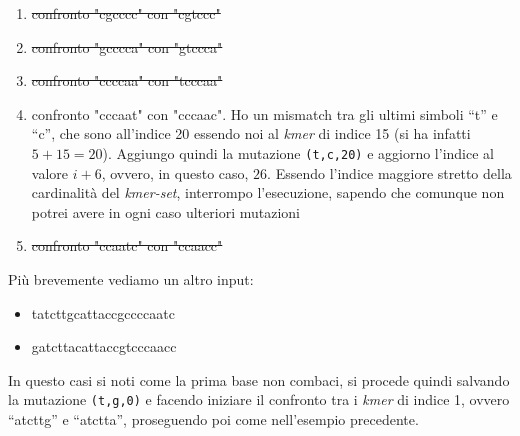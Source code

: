 \documentclass[a4paper,12pt, oneside]{book}
\begin{document}
\begin{esempio}
\begin{enumerate}[start=0]
    \item \sout{confronto "cgcccc" con "cgtccc"}
    \item \sout{confronto "gcccca" con "gtccca"}
    \item \sout{confronto "ccccaa" con "tcccaa"}
    \item confronto "cccaat" con "cccaac". Ho un mismatch tra gli ultimi simboli
    ``t'' e ``c'', che sono all'indice 20 essendo noi al \textit{kmer} di indice
    15 (si ha infatti $5+15=20$). Aggiungo quindi la mutazione
    \texttt{(t,c,20)} 
    e aggiorno l'indice al valore $i+6$, ovvero, in questo caso, $26$. Essendo
    l'indice maggiore stretto della cardinalità del \textit{kmer-set},
    interrompo l'esecuzione, sapendo che comunque non potrei avere in ogni caso
    ulteriori mutazioni
    \item \sout{confronto "ccaatc" con "ccaacc"}
  \end{enumerate}
\end{esempio}
\begin{esempio}
  Più brevemente vediamo un altro input:
  \begin{itemize}
    \item tatcttgcattaccgccccaatc
    \item gatcttacattaccgtcccaacc
  \end{itemize}
  In questo casi si noti come la prima base non combaci, si procede quindi
  salvando la mutazione \texttt{(t,g,0)} e facendo iniziare il confronto tra i
  \textit{kmer} di indice 1, ovvero ``atcttg'' e ``atctta'', proseguendo poi
  come nell'esempio precedente.
\end{esempio}
\end{document}
